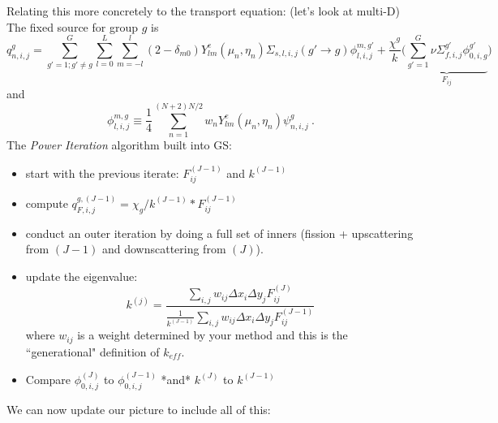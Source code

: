 \documentclass[12pt]{article}
\begin{document}
\vspace*{1 em}
Relating this more concretely to the transport equation: (let's look at multi-D)
\\
The fixed source for group $g$ is
\[
q_{n,i,j}^g = \sum_{g'=1; g' \neq g}^G \sum_{l=0}^L \sum_{m=-l}^l (2 - \delta_{m0})Y_{lm}^e(\mu_n, \eta_n) \Sigma_{s,l,i,j}(g' \rightarrow g) \phi_{l,i,j}^{m,g'} + \frac{\chi^g}{k}\bigl(\underbrace{\sum_{g'=1}^G \nu \Sigma_{f,i,j}^{g'} \phi_{0,i,g}^{g'}}_{F_{ij}} \bigr)
\]
and
\[
\phi_{l,i,j}^{m,g} \equiv \frac{1}{4}\sum_{n=1}^{(N+2)N/2} w_n Y_{lm}^e(\mu_n, \eta_n) \psi_{n,i,j}^g\:.
\]
%
The \textit{Power Iteration} algorithm built into GS:
\begin{itemize}
\item start with the previous iterate: $F_{ij}^{(J-1)}$ and $k^{(J-1)}$
\item compute $q_{F,i,j}^{g,(J-1)} = \chi_g / k^(J-1) * F_{ij}^{(J-1)}$
\item conduct an outer iteration by doing a full set of inners (fission + upscattering from $(J-1)$ and downscattering from $(J)$). 

\item update the eigenvalue:
\[
k^{(j)} = \dfrac{\sum_{i,j} w_{ij} \Delta x_i \Delta y_j F_{ij}^{(J)}}{\frac{1}{k^{(J-1)} }\sum_{i,j} w_{ij} \Delta x_i \Delta y_j F_{ij}^{(J-1)}}
\]
where $w_{ij}$ is a weight determined by your method and this is the ``generational" definition of $k_{eff}$.

\item Compare $\phi_{0,i,j}^{(J)}$ to $\phi_{0,i,j}^{(J-1)}$ *and* $k^{(J)}$ to $k^{(J-1)}$
\end{itemize}

We can now update our picture to include all of this:
\end{document}
